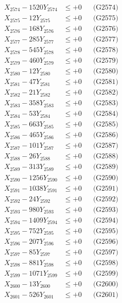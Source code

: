 \documentclass[a4paper,10pt]{article}
\begin{document}
{\begin{align}
X_{2574} - 1520Y_{2574} &\leq +0 && \text{(G2574)} \\
X_{2575} - 12Y_{2575} &\leq +0 && \text{(G2575)} \\
X_{2576} - 168Y_{2576} &\leq +0 && \text{(G2576)} \\
X_{2577} - 285Y_{2577} &\leq +0 && \text{(G2577)} \\
X_{2578} - 545Y_{2578} &\leq +0 && \text{(G2578)} \\
X_{2579} - 460Y_{2579} &\leq +0 && \text{(G2579)} \\
X_{2580} - 12Y_{2580} &\leq +0 && \text{(G2580)} \\
\allowbreak
X_{2581} - 47Y_{2581} &\leq +0 && \text{(G2581)} \\
X_{2582} - 21Y_{2582} &\leq +0 && \text{(G2582)} \\
X_{2583} - 358Y_{2583} &\leq +0 && \text{(G2583)} \\
X_{2584} - 53Y_{2584} &\leq +0 && \text{(G2584)} \\
X_{2585} - 663Y_{2585} &\leq +0 && \text{(G2585)} \\
X_{2586} - 465Y_{2586} &\leq +0 && \text{(G2586)} \\
X_{2587} - 101Y_{2587} &\leq +0 && \text{(G2587)} \\
X_{2588} - 26Y_{2588} &\leq +0 && \text{(G2588)} \\
X_{2589} - 313Y_{2589} &\leq +0 && \text{(G2589)} \\
X_{2590} - 1256Y_{2590} &\leq +0 && \text{(G2590)} \\
\allowbreak
X_{2591} - 1038Y_{2591} &\leq +0 && \text{(G2591)} \\
X_{2592} - 24Y_{2592} &\leq +0 && \text{(G2592)} \\
X_{2593} - 980Y_{2593} &\leq +0 && \text{(G2593)} \\
X_{2594} - 1409Y_{2594} &\leq +0 && \text{(G2594)} \\
X_{2595} - 752Y_{2595} &\leq +0 && \text{(G2595)} \\
X_{2596} - 207Y_{2596} &\leq +0 && \text{(G2596)} \\
X_{2597} - 85Y_{2597} &\leq +0 && \text{(G2597)} \\
X_{2598} - 881Y_{2598} &\leq +0 && \text{(G2598)} \\
X_{2599} - 1071Y_{2599} &\leq +0 && \text{(G2599)} \\
X_{2600} - 13Y_{2600} &\leq +0 && \text{(G2600)} \\
\allowbreak
X_{2601} - 526Y_{2601} &\leq +0 && \text{(G2601)} \\

\end{align}}
\end{document}

